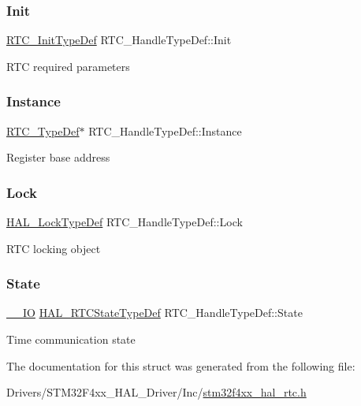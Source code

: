 \subsubsection{\texorpdfstring{Init}{Init}}
{\footnotesize\ttfamily \hyperlink{struct_r_t_c___init_type_def}{R\+T\+C\+\_\+\+Init\+Type\+Def} R\+T\+C\+\_\+\+Handle\+Type\+Def\+::\+Init}

R\+TC required parameters \mbox{\label{struct_r_t_c___handle_type_def_a6a7bc50c975a169d24ba0a174f260abc}} 
\subsubsection{\texorpdfstring{Instance}{Instance}}
{\footnotesize\ttfamily \hyperlink{struct_r_t_c___type_def}{R\+T\+C\+\_\+\+Type\+Def}$\ast$ R\+T\+C\+\_\+\+Handle\+Type\+Def\+::\+Instance}

Register base address \mbox{\label{struct_r_t_c___handle_type_def_ae72730d37db2c70485236bb9ff400592}} 
\subsubsection{\texorpdfstring{Lock}{Lock}}
{\footnotesize\ttfamily \hyperlink{stm32f4xx__hal__def_8h_ab367482e943333a1299294eadaad284b}{H\+A\+L\+\_\+\+Lock\+Type\+Def} R\+T\+C\+\_\+\+Handle\+Type\+Def\+::\+Lock}

R\+TC locking object \mbox{\label{struct_r_t_c___handle_type_def_ae6f4d8c6cf47f2bd0823d5b570e44774}} 
\subsubsection{\texorpdfstring{State}{State}}
{\footnotesize\ttfamily \hyperlink{core__sc300_8h_aec43007d9998a0a0e01faede4133d6be}{\+\_\+\+\_\+\+IO} \hyperlink{group___r_t_c___exported___types_ga1e2460a2d13c4efc7a2a1ab2a1ebd32b}{H\+A\+L\+\_\+\+R\+T\+C\+State\+Type\+Def} R\+T\+C\+\_\+\+Handle\+Type\+Def\+::\+State}

Time communication state 

The documentation for this struct was generated from the following file\+:\begin{DoxyCompactItemize}
\item 
Drivers/\+S\+T\+M32\+F4xx\+\_\+\+H\+A\+L\+\_\+\+Driver/\+Inc/\hyperlink{stm32f4xx__hal__rtc_8h}{stm32f4xx\+\_\+hal\+\_\+rtc.\+h}\end{DoxyCompactItemize}
